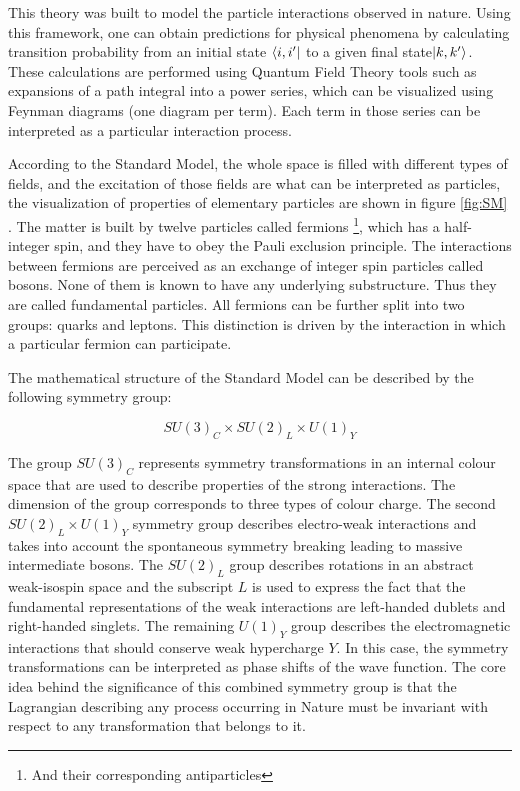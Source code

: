 This theory was built to model the particle interactions observed in nature. Using this framework, one can obtain predictions for physical phenomena by calculating transition probability from an initial state $\langle i, i'\rvert$ to a given final state$\lvert k, k' \rangle$. These calculations are performed using Quantum Field Theory tools such as expansions of a path integral into a power series, which can be visualized using Feynman diagrams (one diagram per term). Each term in those series can be interpreted as a particular interaction process. 

According to the Standard Model, the whole space is filled with different types of fields, and the excitation of those fields are what can be interpreted as particles, the visualization of properties of elementary particles are shown in figure \ref{fig:SM} . The matter is built by twelve particles called fermions \footnote{And their corresponding antiparticles}, which has a half-integer spin, and they have to obey the Pauli exclusion principle. The interactions between fermions are perceived as an exchange of integer spin particles called bosons. 
None of them is known to have any underlying substructure. Thus they are called fundamental particles.
All fermions can be further split into two groups: quarks and leptons. This distinction is driven by the interaction in which a particular fermion can participate. 


The mathematical structure of the Standard Model can be described by the following symmetry group:

\begin{equation}
    SU(3)_C \times SU(2)_L \times U(1)_Y
\end{equation}

The group $SU(3)_C$ represents symmetry transformations in an internal colour space that are used to describe properties of the strong interactions. The dimension of the group corresponds to three types of colour charge. The second $SU(2)_L \times U(1)_Y$ symmetry group describes electro-weak interactions and takes into account the spontaneous symmetry breaking leading to massive intermediate bosons. The $SU(2)_L$ group describes rotations in an abstract weak-isospin space and the subscript $L$ is used to express the fact that the fundamental representations of the weak interactions are left-handed dublets and right-handed singlets. The remaining $U(1)_Y$ group describes the electromagnetic interactions that should conserve weak hypercharge $Y$. In this case, the symmetry transformations can be interpreted as phase shifts of the wave function. The core idea behind the significance of this combined symmetry group is that the Lagrangian describing any process occurring in Nature must be invariant with respect to any transformation that belongs to it.

